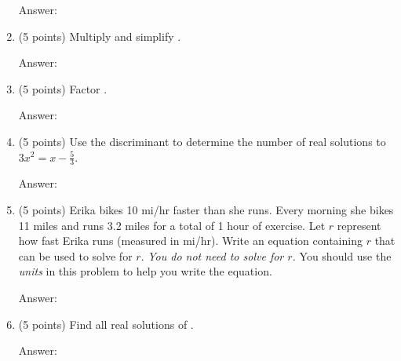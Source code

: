 \documentclass[12pt]{article}
\begin{document}
\begin{enumerate}
\hfill { Answer:\underline{\hspace{2in}}}\vfill
\item (5 points) Multiply and simplify .
\begin{flushright}{ Answer:\underline{\hspace{2in}}}\end{flushright}
\vfill
\item (5 points) Factor \scalebox{1.2}{$8-125y^3$}.
\begin{flushright}{ Answer:\underline{\hspace{2in}}}\end{flushright}
\vspace{.75in}
\item (5 points) Use the discriminant to determine the number of real solutions to  $3x^2=x-\frac{5}{3}$.
\begin{flushright}{ Answer:\underline{\hspace{2in}}}\end{flushright}
\vspace{.75in}
\newpage
\item (5 points) Erika bikes 10 mi/hr faster than she runs. Every morning she bikes 11 miles and runs 3.2 miles for a total of 1 hour of exercise. Let $r$ represent how fast Erika runs (measured in mi/hr). Write an equation containing $r$ that can be used to solve for $r.$ {\emph{You do not need to solve for $r$.}} You should use the {\it{units}} in this problem to help you write the equation.\\

\begin{flushright}{ Answer:\underline{\hspace{2in}}}\end{flushright}
\vfill
\item (5 points) Find all real solutions of \scalebox{1.2}{$ x^6-7x^3-8=0$}. 
\begin{flushright}{ Answer:\underline{\hspace{2in}}}\end{flushright}
\vfill


\end{enumerate}
\end{document}
